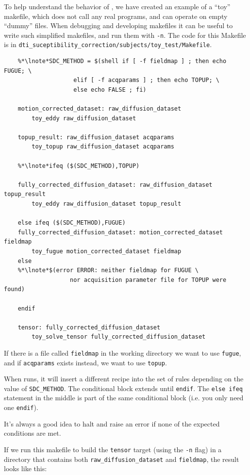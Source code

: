 To help understand the behavior of \maken{}, we have created an
example of a ``toy'' makefile, which does not call any real programs,
and can operate on empty ``dummy'' files. When debugging and
developing makefiles it can be useful to write such simplified
makefiles, and run them with \maken{} \texttt{-n}. The code for this
Makefile is in \texttt{dti_suceptibility_correction/subjects/toy_test/Makefile}.


\begin{lstlisting}
	%*\lnote*SDC_METHOD = $(shell if [ -f fieldmap ] ; then echo FUGUE; \
                    elif [ -f acqparams ] ; then echo TOPUP; \
                    else echo FALSE ; fi)

	motion_corrected_dataset: raw_diffusion_dataset
	    toy_eddy raw_diffusion_dataset

	topup_result: raw_diffusion_dataset acqparams
	    toy_topup raw_diffusion_dataset acqparams

	%*\lnote*ifeq ($(SDC_METHOD),TOPUP)

	fully_corrected_diffusion_dataset: raw_diffusion_dataset topup_result
	    toy_eddy raw_diffusion_dataset topup_result

	else ifeq ($(SDC_METHOD),FUGUE)
	fully_corrected_diffusion_dataset: motion_corrected_dataset fieldmap
	    toy_fugue motion_corrected_dataset fieldmap
	else
	%*\lnote*$(error ERROR: neither fieldmap for FUGUE \
	               nor acquisition parameter file for TOPUP were found)

	endif

	tensor: fully_corrected_diffusion_dataset
	    toy_solve_tensor fully_corrected_diffusion_dataset

\end{lstlisting}


If there is a file called \texttt{fieldmap} in the working directory we want to use \texttt{fugue}, and if \texttt{acqparams} exists instead, we want to use \texttt{topup}.

When \maken{} runs, it will insert a different recipe into the set of rules depending on the value of \texttt{SDC_METHOD}. The conditional block extends until \texttt{endif}. The \texttt{else ifeq} statement in the middle is part of the same conditional block (i.e. you only need one \texttt{endif}).

It's always a good idea to halt and raise an error if none of the expected conditions are met. \break

If we run this makefile to build the \texttt{tensor} target (using the \texttt{-n} flag) in a directory that contains both \texttt{raw_diffusion_dataset} and \texttt{fieldmap}, the result looks like this:


